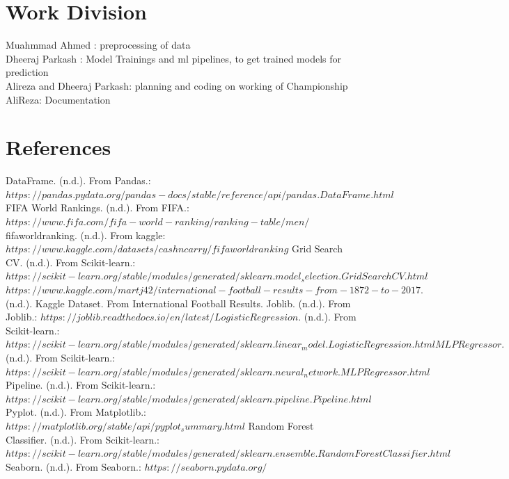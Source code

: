 \documentclass[letterpaper]{article}
\begin{document}
		\section*{Work Division}
			Muahmmad Ahmed :  preprocessing of data\\
			Dheeraj Parkash : Model Trainings and ml pipelines, to get trained models for prediction\\
			Alireza and Dheeraj Parkash: planning and coding  on working of Championship  \\
			AliReza: Documentation\\
		
		\newpage
	\section*{References}
			DataFrame. (n.d.). From Pandas.: $https://pandas.pydata.org/pandas-docs/stable/reference/api/pandas.DataFrame.html$
			FIFA World Rankings. (n.d.). From FIFA.: $https://www.fifa.com/fifa-world-ranking/ranking-table/men/$
			fifaworldranking. (n.d.). From kaggle: $https://www.kaggle.com/datasets/cashncarry/fifaworldranking$
			Grid Search CV. (n.d.). From Scikit-learn.: $https://scikit-learn.org/stable/modules/generated/sklearn.model_selection.GridSearchCV.html$
			$https://www.kaggle.com/martj42/international-football-results-from-1872-to-2017.$ (n.d.). Kaggle Dataset. From International Football Results.
			Joblib. (n.d.). From Joblib.: $https://joblib.readthedocs.io/en/latest/
			Logistic Regression.$ (n.d.). From Scikit-learn.: $https://scikit-learn.org/stable/modules/generated/sklearn.linear_model.LogisticRegression.html
			MLP Regressor.$ (n.d.). From Scikit-learn.: $https://scikit-learn.org/stable/modules/generated/sklearn.neural_network.MLPRegressor.html$
			Pipeline. (n.d.). From Scikit-learn.: $https://scikit-learn.org/stable/modules/generated/sklearn.pipeline.Pipeline.html$
			Pyplot. (n.d.). From Matplotlib.: $https://matplotlib.org/stable/api/pyplot_summary.html$
			Random Forest Classifier. (n.d.). From Scikit-learn.: $https://scikit-learn.org/stable/modules/generated/sklearn.ensemble.RandomForestClassifier.html$
			Seaborn. (n.d.). From Seaborn.: $https://seaborn.pydata.org/$
		
		
		
\end{document}
